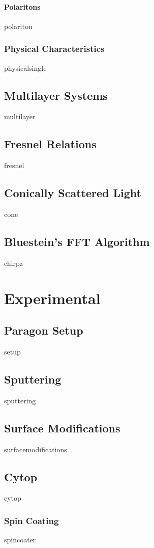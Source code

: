 \documentclass[a4paper,titlepage,onecolumn]{report}
\begin{document}
		\subsubsection{Polaritons}
		{polariton}
  \subsection{Physical Characteristics}
  {physicalsingle}
 \section{Multilayer Systems}
 {multilayer}
 \section{Fresnel Relations}
 {fresnel}
 \section{Conically Scattered Light}\label{sec:coneexist}
 {cone}
 \section{Bluestein's FFT Algorithm}
 {chirpz}

\chapter{Experimental} \label{ch:experimental}
 \section{Paragon Setup}
 {setup}
 \section{Sputtering}
 {sputtering}
 \section{Surface Modifications}
  {surfacemodifications}
 \section{Cytop}
 {cytop}
  \subsection{Spin Coating}
  {spincoater}
\end{document}
